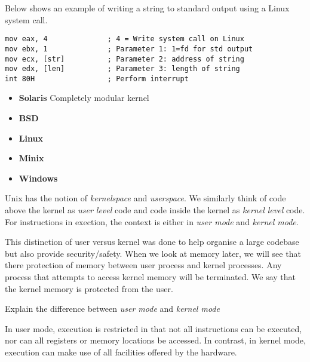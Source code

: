 \begin{example}
Below shows an example of writing a string to standard output using 
a Linux system call. 
\begin{lstlisting}
mov eax, 4              ; 4 = Write system call on Linux  
mov ebx, 1              ; Parameter 1: 1=fd for std output
mov ecx, [str]          ; Parameter 2: address of string
mov edx, [len]          ; Parameter 3: length of string
int 80H                 ; Perform interrupt
\end{lstlisting}
\end{example}

\frmrule



\begin{itemize}   
\renewcommand{\labelitemi}{$\Box$}
\item \textbf{Solaris} 
Completely modular kernel
\item \textbf{BSD} 
\item \textbf{Linux} 
\item \textbf{Minix} 
\item \textbf{Windows} 
\end{itemize}

Unix has the notion of \textit{kernelspace} and \textit{userspace}. 
We similarly think of code above the kernel as \textit{user level} code and 
code inside the kernel as \textit{kernel level} code.
For instructions in exection, the context is either in 
\textit{user mode} and \textit{kernel mode}.

This distinction of user versus kernel
 was done to help organise a large codebase but also provide security/safety.
When we look at memory later, we will see that there protection of 
memory between user process and kernel processes. Any process that attempts to access 
kernel memory will be terminated. We say that the kernel memory is protected from the user. 

\begin{example}
Explain the difference between \textit{user mode} and \textit{kernel mode}

In user mode, execution is restricted in that not all instructions can be executed, nor can all registers or memory locations be accessed. In contrast, in kernel mode, execution can make use of all facilities offered by the hardware.
\end{example}


